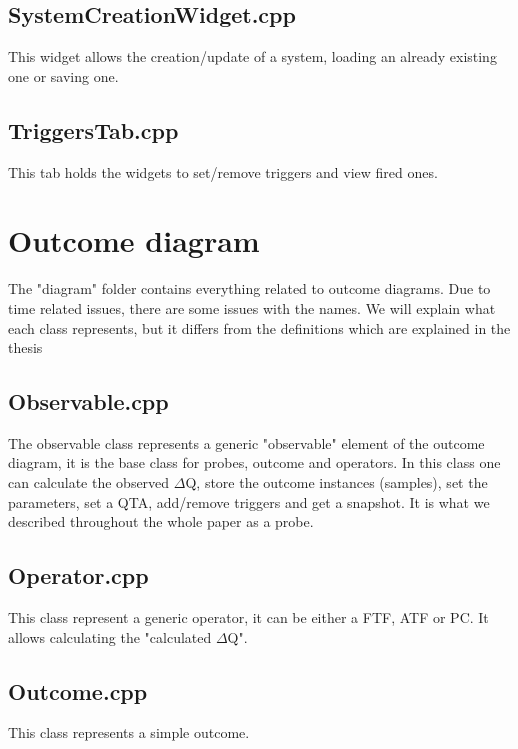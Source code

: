 \subsection{SystemCreationWidget.cpp} \label{code:syscw}
This widget allows the creation/update of a system, loading an already existing one or saving one.


\subsection{TriggersTab.cpp} \label{code:tt}
This tab holds the widgets to set/remove triggers and view fired ones. 


\section{Outcome diagram}

The "diagram" folder contains everything related to outcome diagrams. Due to time related issues, there are some issues with the names. We will explain what each class represents, but it differs from the definitions which are explained in the thesis

\subsection{Observable.cpp} \label{code:obs}
The observable class represents a generic "observable" element of the outcome diagram, it is the base class for probes, outcome and operators. In this class one can calculate the observed $\Delta$Q, store the outcome instances (samples), set the parameters, set a QTA, add/remove triggers and get a snapshot. It is what we described throughout the whole paper as a probe.


\subsection{Operator.cpp} \label{code:op}
This class represent a generic operator, it can be either a FTF, ATF or PC. It allows calculating the "calculated $\Delta$Q".


\subsection{Outcome.cpp} \label{code:outc}
This class represents a simple outcome.


